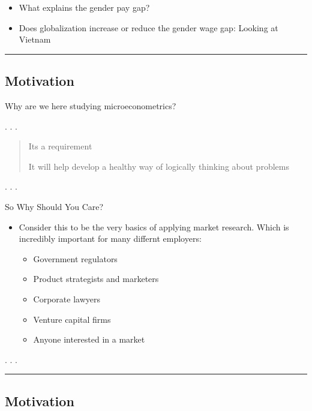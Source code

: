 \documentclass[
  letterpaper,
  DIV=11,
  numbers=noendperiod]{scrartcl}
\providecommand{\tightlist}{%
  \setlength{\itemsep}{0pt}\setlength{\parskip}{0pt}}\usepackage{longtable,booktabs,array}
\begin{document}
\begin{itemize}
\tightlist
\item
  {What explains the gender pay gap?}
\item
  {Does globalization increase or reduce the gender wage gap: Looking at
  Vietnam}
\end{itemize}

\begin{center}\rule{0.5\linewidth}{0.5pt}\end{center}

\hypertarget{motivation-2}{%
\subsection{Motivation}\label{motivation-2}}

Why are we here studying microeconometrics?

. . .

\begin{quote}
Its a requirement

It will help develop a healthy way of logically thinking about problems
\end{quote}

. . .

{So Why Should You Care?}

\begin{itemize}
\item
  Consider this to be the very basics of applying market research. Which
  is incredibly important for many differnt employers:

  \begin{itemize}
  \tightlist
  \item
    Government regulators
  \item
    Product strategists and marketers
  \item
    Corporate lawyers
  \item
    Venture capital firms
  \item
    Anyone interested in a market
  \end{itemize}
\end{itemize}

. . .

\begin{center}\rule{0.5\linewidth}{0.5pt}\end{center}

\hypertarget{motivation-3}{%
\subsection{Motivation}\label{motivation-3}}
\end{document}
